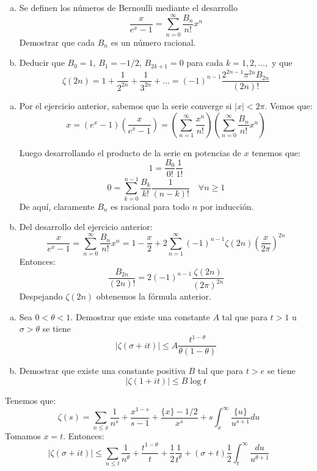 \documentclass[twoside]{article}
\begin{document}
\newpage
\begin{ejercicio}{6}
\begin{enumerate}[(a)]
	\item Se definen los números de Bernoulli mediante el desarrollo
	\[ \frac{x}{e^x-1} = \sum_{n=0}^{∞} \frac{B_n}{n!}x^n \]
	Demostrar que cada $B_n$ es un número racional.
	\item Deducir que $B_0 = 1$, $B_1 = -1/2$, $B_{2k+1} = 0$ para cada $k=1,2,\dots,$ y que
	\[ ζ(2n) = 1 + \frac{1}{2^{2n}} + \frac{1}{3^{2n}} + \dots = (-1)^{n-1} \frac{2^{2n-1}π^{2n}B_{2n}}{(2n)!} \]
\end{enumerate}
\end{ejercicio}
\begin{solucion}\mbox{}
\begin{enumerate}[(a)]
	\item Por el ejercicio anterior, sabemos que la serie converge si $|x|<2π$. Vemos que:
	\[ x = (e^x-1)\left(\frac{x}{e^x-1}\right) = \left(\sum_{n=1}^{∞} \frac{x^n}{n!}\right)\left(\sum_{n=0}^{∞} \frac{B_n}{n!}x^n\right)\]

Luego desarrollando el producto de la serie en potencias de $x$ tenemos que:
\[ 1 = \frac{B_0}{0!}\frac{1}{1!} \]
\[ 0 = \sum_{k=0}^{n-1} \frac{B_k}{k!} \frac{1}{(n-k)!} \quad \forall n≥1\]
De aquí, claramente $B_n$ es racional para todo $n$ por inducción.

	\item Del desarrollo del ejercicio anterior:
	\[ \frac{x}{e^x-1} = \sum_{n=0}^{∞} \frac{B_n}{n!} x^n = 1-\frac{x}{2} + 2 \sum_{n=1}^{∞} (-1)^{n-1} ζ(2n) \left(\frac{x}{2π}\right)^{2n}\]
	Entonces:
	\[ \frac{B_{2n}}{(2n)!} = 2(-1)^{n-1} \frac{ζ(2n)}{(2π)^{2n}} \]
	Despejando $ζ(2n)$ obtenemos la fórmula anterior.
\end{enumerate}
\end{solucion}

\newpage
\begin{ejercicio}{7}\mbox{}
\begin{enumerate}[(a)]
\item Sea $0<θ<1$. Demostrar que existe una constante $A$ tal que para $t>1$ u $σ>θ$ se tiene
$$
|ζ(σ +it)|\leq A\frac{t^{1-\theta}}{\theta(1-\theta)}
$$
\item Demostrar que existe una constante positiva $B$ tal que para $t>e$ se tiene
$$
|ζ(1+it)|≤ B\log t
$$
\end{enumerate}
\end{ejercicio}
\begin{solucion}
Tenemos que:
\[ ζ(s) = \sum_{n≤x} \frac{1}{n^s} + \frac{x^{1-s}}{s-1} + \frac{\{x\}-1/2}{x^s}+s \int_x^{∞} \frac{\{u\}}{u^{s+1}} du \]
Tomamos $x=t$. Entonces:
\[ |ζ(σ+it)| ≤ \sum_{n≤t} \frac{1}{n^θ} + \frac{t^{1-θ}}{t} + \frac{1}{2} \frac{1}{t^θ} + (σ+t)\frac{1}{2} \int_t^{∞} \frac{du}{u^{θ+1}} \]
\end{solucion}
\end{document}
